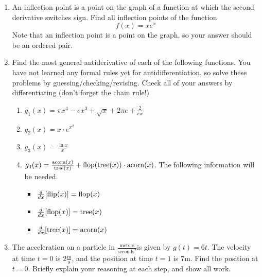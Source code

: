 \documentclass{article}
\begin{document}
\begin{itemize}
\begin{enumerate}
 



                \item An inflection point is a point on the graph of a function at which the second derivative switches sign. Find all inflection points of the function $$f(x) = xe^x$$
                Note that an inflection point is a point on the graph, so your answer should be an ordered pair.

                \item Find the most general antiderivative of each of the following functions. You have not learned any formal rules yet for antidifferentiation, so solve these problems by guessing/checking/revising. Check all of your answers by differentiating (don't forget the chain rule!)
                    \begin{enumerate}
                        \item $\displaystyle g_1(x) = \pi x^4-ex^3+\sqrt{x}+2\pi e + \frac{2}{ex}$
                        \item $g_2(x) = x\cdot e^{x^2}$
                        \item $g_3(x) = \frac{\ln{x}}{x}$
                        \item $g_4(x)= \frac{\textnormal{acorn}(x)}{\textnormal{tree}(x)} +\textnormal{flop}(\textnormal{tree}(x))\cdot \textnormal{acorn}(x)$.  The following information will be needed.
                        \begin{itemize}
                            \item $\frac{d}{dx}[\textnormal{flip}(x)] = \textnormal{flop}(x)$
                            \item $\frac{d}{dx}[\textnormal{flop}(x)] = \textnormal{tree}(x)$
                            \item $\frac{d}{dx}[\textnormal{tree}(x)] = \textnormal{acorn}(x)$
                        \end{itemize}
                    \end{enumerate}
 
                \item The acceleration on a particle in $\displaystyle \frac{\text{meters}}{\text{seconds}^2}$is given by $g(t) = 6t$. The velocity at time $t=0$ is $2\frac{\text{m}}{\text{s}}$, and the position at time $t=1$ is $7 \text{m}$. Find the position at $t=0$. Briefly explain your reasoning at each step, and show all work.
 
        \end{enumerate}


\end{itemize}
\end{document}
